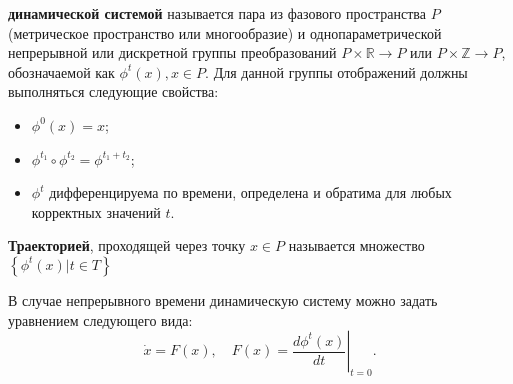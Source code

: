 
\begin{definition}
    \textbf{динамической системой} называется пара из фазового пространства $P$ (метрическое пространство или многообразие) и однопараметрической непрерывной или дискретной группы преобразований $P \times \mathbb{R} \to P$ или $P \times \mathbb{Z} \to P$, обозначаемой как $\phi^t(x), x \in P$.
    Для данной группы отображений должны выполняться следующие свойства:
    \begin{itemize}
    \item
        $\phi^0\left( x \right) = x$;
    \item
        $\phi^{t_1} \circ \phi^{t_2} = \phi^{t_1 + t_2}$;
    \item
        $\phi^t$ дифференцируема по времени, определена и обратима для любых корректных значений $t$.
    \end{itemize}
\end{definition}

\begin{definition}[Траектория]
    \textbf{Траекторией}, проходящей через точку $x \in P$ называется множество $\left\{ \phi^t\left( x \right) | t \in T \right\}$
\end{definition}


В случае непрерывного времени динамическую систему можно задать уравнением следующего вида:
\begin{equation*}
    \dot{x} = F(x),
    \quad
    F(x) = \left. \frac{d\phi^t(x)}{dt} \right|_{t=0}.
\end{equation*}

